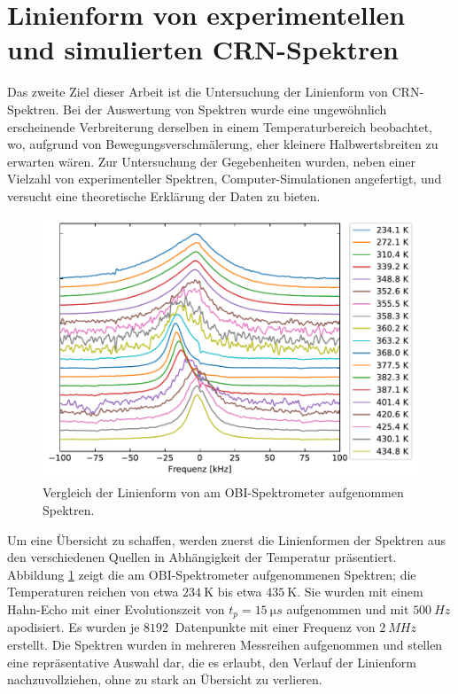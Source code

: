 \section{Linienform von experimentellen und simulierten CRN-Spektren} \label{section:res:spektren}

Das zweite Ziel dieser Arbeit ist die Untersuchung der Linienform von CRN-Spektren. Bei der Auswertung von Spektren wurde eine ungewöhnlich erscheinende Verbreiterung derselben in einem Temperaturbereich beobachtet, wo, aufgrund von Bewegungsverschmälerung, eher kleinere Halbwertsbreiten zu erwarten wären. Zur Untersuchung der Gegebenheiten wurden, neben einer Vielzahl von experimenteller Spektren, Computer-Simulationen angefertigt, und versucht eine theoretische Erklärung der Daten zu bieten.

\begin{figure}
	\begin{center}
		\includegraphics[width=\textwidth]{graphics/plot/spek_lineshape.pdf}
	\end{center}
	\caption{Vergleich der Linienform von am OBI-Spektrometer aufgenommen Spektren.} \label{fig:res:spek_linienform}
\end{figure}
Um eine Übersicht zu schaffen, werden zuerst die Linienformen der Spektren aus den verschiedenen Quellen in Abhängigkeit der Temperatur präsentiert. Abbildung \ref{fig:res:spek_linienform} zeigt die am OBI-Spektrometer aufgenommenen Spektren; die Temperaturen reichen von etwa $\SI{234}{\kelvin}$ bis etwa $\SI{435}{\kelvin}$. Sie wurden mit einem Hahn-Echo mit einer Evolutionszeit von $t_p = \SI{15}{\micro s}$ aufgenommen und mit $\SI{500}{Hz}$ apodisiert. Es wurden je $\SI{8192}{}$ Datenpunkte mit einer Frequenz von $\SI{2}{MHz}$ erstellt. Die Spektren wurden in mehreren Messreihen aufgenommen und stellen eine repräsentative Auswahl dar, die es erlaubt, den Verlauf der Linienform nachzuvollziehen, ohne zu stark an Übersicht zu verlieren.

